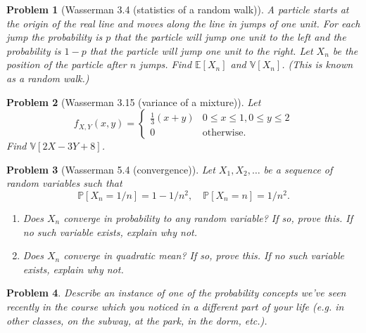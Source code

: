 \documentclass{article}
\newtheorem{problem}{Problem}
\newcommand{\PP}{\mathbb{P}}
\newcommand{\EE}{\mathbb{E}}
\newcommand{\VV}{\mathbb{V}}
\begin{document}
\begin{problem}[Wasserman 3.4 (statistics of a random walk)]
A particle starts at the origin of the real line and moves along the line in
jumps of one unit. For each jump the probability is $p$ that the particle
will jump one unit to the left and the probability is $1-p$ that the particle
will jump one unit to the right. Let $X_n$ be the position of the particle
after $n$ jumps. 
Find $\EE[X_n]$ and $\VV[X_n]$. 
(This is known as a random walk.)
\end{problem}


\begin{problem}[Wasserman 3.15 (variance of a mixture)]
    Let
    \begin{equation*}
        f_{X,Y}(x,y) = \begin{cases} \frac{1}{3}(x+y) & 0\leq x \leq 1, 0\leq y \leq 2 \\ 0& \text{otherwise.} \end{cases}
    \end{equation*}
    Find $\VV[2X-3Y+8]$.
\end{problem}

\begin{problem}[Wasserman 5.4 (convergence)]
\item Let $X_1, X_2, \ldots$ be a sequence of random variables such that
    \begin{equation*}
        \PP[X_n = 1/n] = 1 - 1/n^2
        ,\quad
        \PP[X_n = n] = 1/n^2.
    \end{equation*}
    \begin{enumerate}[label=(\alph*),topsep=0pt]
        \item Does $X_n$ converge in probability to any random variable? 
            If so, prove this. If no such variable exists, explain why not. 
        \item Does $X_n$ converge in quadratic mean?
            If so, prove this. If no such variable exists, explain why not. 
    \end{enumerate} 
\end{problem}

\begin{problem}
    Describe an instance of one of the probability concepts we've seen recently in the course which you noticed in a different part of your life (e.g. in other classes, on the subway, at the park, in the dorm, etc.).
\end{problem}
\end{document}
